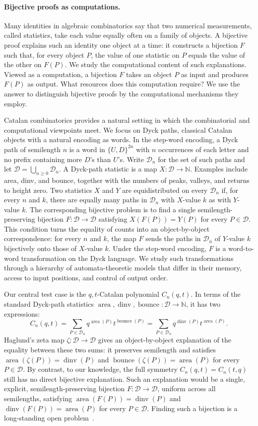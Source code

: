 \documentclass[11pt]{article}
\theoremstyle{definition}
\newcommand{\D}{\mathcal D}
\newcommand{\N}{\mathbb N}
\newcommand{\area}{\operatorname{area}}
\newcommand{\dinv}{\operatorname{dinv}}
\newcommand{\bounce}{\operatorname{bounce}}
\begin{document}
\paragraph{Bijective proofs as computations.}

Many identities in algebraic combinatorics say that two numerical
measurements, called statistics, take each value equally often on a family of
objects.  A bijective proof explains such an identity one object at a time: it
constructs a bijection $F$ such that, for every object $P$, the value of one
statistic on $P$ equals the value of the other on $F(P)$.  We study the
computational content of such explanations.  Viewed as a computation, a
bijection $F$ takes an object $P$ as input and produces $F(P)$ as output.  What
resources does this computation require?  We use the answer to distinguish
bijective proofs by the computational mechanisms they employ.

Catalan combinatorics provides a natural setting in which the combinatorial and
computational viewpoints meet.  We focus on Dyck paths, classical Catalan
objects with a natural encoding as words.  In the step-word encoding, a Dyck
path of semilength $n$ is a word in $\{U,D\}^{2n}$ with $n$ occurrences of each
letter and no prefix containing more $D$'s than $U$'s.  Write $\D_n$
for the set of such paths and let $\D=\bigcup_{n\ge 0}\D_n$.  A Dyck-path
statistic is a map $X\colon\D\to\N$.  Examples include area, dinv, and bounce,
together with the numbers of peaks, valleys, and returns to height zero.  Two
statistics $X$ and $Y$ are equidistributed on every $\D_n$ if, for every $n$
and $k$, there are equally many paths in $\D_n$ with $X$-value $k$ as with
$Y$-value $k$.  The corresponding bijective problem is to find a single
semilength-preserving bijection $F\colon\D\to\D$ satisfying
$X(F(P))=Y(P)$ for every $P\in\D$.  This condition turns the equality of counts
into an object-by-object correspondence: for every $n$ and $k$, the map $F$
sends the paths in $\D_n$ of $Y$-value $k$ bijectively onto those of $X$-value
$k$.  Under the step-word encoding, $F$ is a word-to-word transformation on the
Dyck language.  We study such transformations through a hierarchy of
automata-theoretic models that differ in their memory, access to input
positions, and control of output order.

Our central test case is the $q,t$-Catalan polynomial $C_n(q,t)$.  In terms of
the standard Dyck-path statistics
$\area,\dinv,\bounce\colon\D\to\N$, it has two expressions:
\[
   C_n(q,t)=\sum_{P\in\D_n} q^{\area(P)}t^{\bounce(P)}
   =
   \sum_{P\in\D_n} q^{\dinv(P)}t^{\area(P)}.
\]
Haglund's zeta map $\zeta\colon\D\to\D$ gives an object-by-object explanation
of the equality between these two sums: it preserves semilength and satisfies
$\area(\zeta(P))=\dinv(P)$ and $\bounce(\zeta(P))=\area(P)$ for every
$P\in\D$.  By contrast, to our knowledge, the full symmetry
$C_n(q,t)=C_n(t,q)$ still has no direct bijective explanation.  Such an
explanation would be a single, explicit, semilength-preserving bijection
$F\colon\D\to\D$, uniform across all semilengths, satisfying
$\area(F(P))=\dinv(P)$ and $\dinv(F(P))=\area(P)$ for every $P\in\D$.
Finding such a bijection is a long-standing open problem~\cite{Pons2022}.
\end{document}
